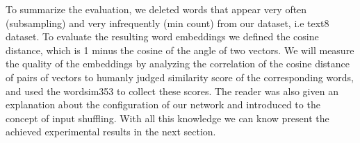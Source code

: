 To summarize the evaluation, we deleted words that appear very often (subsampling) and very infrequently (min count) from our dataset, i.e text8 dataset. To evaluate the resulting word embeddings we defined the cosine distance, which is 1 minus the cosine of the angle of two vectors. We will measure the quality of the embeddings by analyzing the correlation of the cosine distance of pairs of vectors to humanly judged similarity score of the corresponding words, and used the wordsim353 to collect these scores. The reader was also given an explanation about the configuration of our network and introduced to the concept of input shuffling. With all this knowledge we can know present the achieved experimental results in the next section.
